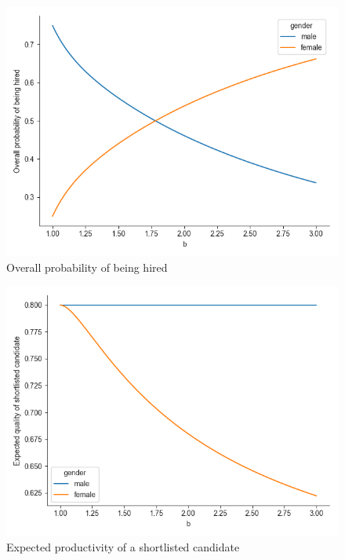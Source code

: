 \documentclass[11pt]{article}
\begin{document}
\begin{figure}[H] %
    \centering
    \caption{Overall probability of being hired}
    \includegraphics[width=\textwidth, keepaspectratio]{plots/overall_prob_hire.png}
\end{figure}

\begin{figure}[H] %
    \centering
    \caption{Expected productivity of a shortlisted candidate}
    \includegraphics[width=\textwidth, keepaspectratio]{plots/expected_quality_shortlist.png}
\end{figure}
\end{document}
